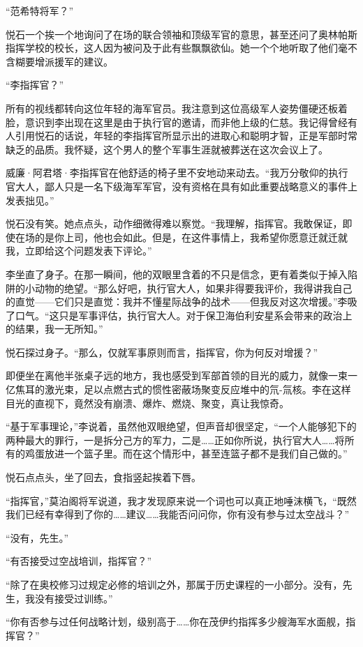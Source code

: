 \documentclass[AutoFakeBold=true]{book}
\begin{document}
``范希特将军？''

悦石一个挨一个地询问了在场的联合领袖和顶级军官的意思，甚至还问了奥林帕斯指挥学校的校长，这人因为被问及于此有些飘飘欲仙。她一个个地听取了他们毫不含糊要增派援军的建议。

``李指挥官？''

所有的视线都转向这位年轻的海军官员。我注意到这位高级军人姿势僵硬还板着脸，意识到李出现在这里是由于执行官的邀请，而非他上级的仁慈。我记得曾经有人引用悦石的话说，年轻的李指挥官所显示出的进取心和聪明才智，正是军部时常缺乏的品质。我怀疑，这个男人的整个军事生涯就被葬送在这次会议上了。

威廉·阿君塔·李指挥官在他舒适的椅子里不安地动来动去。``我万分敬仰的执行官大人，鄙人只是一名下级海军军官，没有资格在具有如此重要战略意义的事件上发表拙见。''

悦石没有笑。她点点头，动作细微得难以察觉。``我理解，指挥官。我敢保证，即使在场的是你上司，他也会如此。但是，在这件事情上，我希望你愿意迁就迁就我，立即给这个问题发表下评论。''

李坐直了身子。在那一瞬间，他的双眼里含着的不只是信念，更有着类似于掉入陷阱的小动物的绝望。``那么好吧，执行官大人，如果非得要我评价，我得讲我自己的直觉——它们只是直觉：我并不懂星际战争的战术——但我反对这次增援。''李吸了口气。``这只是军事评估，执行官大人。对于保卫海伯利安星系会带来的政治上的结果，我一无所知。''

悦石探过身子。``那么，仅就军事原则而言，指挥官，你为何反对增援？''

即便坐在离他半张桌子远的地方，我也感受到军部首领的目光的威力，就像一束一亿焦耳的激光束，足以点燃古式的惯性密蔽场聚变反应堆中的氘-氚核。李在这样目光的直视下，竟然没有崩溃、爆炸、燃烧、聚变，真让我惊奇。

``基于军事理论，''李说着，虽然他双眼绝望，但声音却很坚定，``一个人能够犯下的两种最大的罪行，一是拆分己方的军力，二是……正如你所说，执行官大人……将所有的鸡蛋放进一个篮子里。而在这个情形中，甚至连篮子都不是我们自己做的。''

悦石点点头，坐了回去，食指竖起挨着下唇。

``{\kaishu 指挥官}，''莫泊阁将军说道，我才发现原来说一个词也可以真正地唾沫横飞，``既然我们已经有幸得到了你的……建议……我能否问问你，你有没有参与过太空战斗？''

``没有，先生。''

``有否接受过空战培训，指挥官？''

``除了在奥校修习过规定必修的培训之外，那属于历史课程的一小部分。没有，先生，我没有接受过训练。''

``你有否参与过任何战略计划，级别高于……你在茂伊约指挥多少艘海军水面舰，指挥官？''
\end{document}
